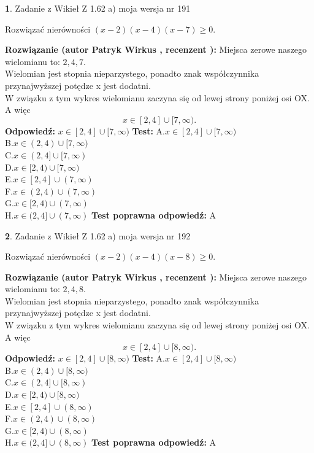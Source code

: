 \documentclass[12pt, a4paper]{article}
\theoremstyle{definition} %
\newtheorem{zad}{}
\newcommand{\zadStart}[1]{\begin{zad}#1\newline}
\newcommand{\zadStop}{\end{zad}}
\newcommand{\rozwStart}[2]{\noindent \textbf{Rozwiązanie (autor #1 , recenzent #2): }\newline}
\newcommand{\rozwStop}{\newline}
\newcommand{\odpStart}{\noindent \textbf{Odpowiedź:}\newline}
\newcommand{\odpStop}{\newline}
\newcommand{\testStart}{\noindent \textbf{Test:}\newline}
\newcommand{\testStop}{\newline}
\newcommand{\kluczStart}{\noindent \textbf{Test poprawna odpowiedź:}\newline}
\newcommand{\kluczStop}{\newline}
\begin{document}
\zadStart{Zadanie z Wikieł Z 1.62 a) moja wersja nr 191}

Rozwiązać nierówności $(x-2)(x-4)(x-7)\ge0$.
\zadStop
\rozwStart{Patryk Wirkus}{}
Miejsca zerowe naszego wielomianu to: $2, 4, 7$.\\
Wielomian jest stopnia nieparzystego, ponadto znak współczynnika przy\linebreak najwyższej potędze x jest dodatni.\\ W związku z tym wykres wielomianu zaczyna się od lewej strony poniżej osi OX. A więc $$x \in [2,4] \cup [7,\infty).$$
\rozwStop
\odpStart
$x \in [2,4] \cup [7,\infty)$
\odpStop
\testStart
A.$x \in [2,4] \cup [7,\infty)$\\
B.$x \in (2,4) \cup [7,\infty)$\\
C.$x \in (2,4] \cup [7,\infty)$\\
D.$x \in [2,4) \cup [7,\infty)$\\
E.$x \in [2,4] \cup (7,\infty)$\\
F.$x \in (2,4) \cup (7,\infty)$\\
G.$x \in [2,4) \cup (7,\infty)$\\
H.$x \in (2,4] \cup (7,\infty)$
\testStop
\kluczStart
A
\kluczStop



\zadStart{Zadanie z Wikieł Z 1.62 a) moja wersja nr 192}

Rozwiązać nierówności $(x-2)(x-4)(x-8)\ge0$.
\zadStop
\rozwStart{Patryk Wirkus}{}
Miejsca zerowe naszego wielomianu to: $2, 4, 8$.\\
Wielomian jest stopnia nieparzystego, ponadto znak współczynnika przy\linebreak najwyższej potędze x jest dodatni.\\ W związku z tym wykres wielomianu zaczyna się od lewej strony poniżej osi OX. A więc $$x \in [2,4] \cup [8,\infty).$$
\rozwStop
\odpStart
$x \in [2,4] \cup [8,\infty)$
\odpStop
\testStart
A.$x \in [2,4] \cup [8,\infty)$\\
B.$x \in (2,4) \cup [8,\infty)$\\
C.$x \in (2,4] \cup [8,\infty)$\\
D.$x \in [2,4) \cup [8,\infty)$\\
E.$x \in [2,4] \cup (8,\infty)$\\
F.$x \in (2,4) \cup (8,\infty)$\\
G.$x \in [2,4) \cup (8,\infty)$\\
H.$x \in (2,4] \cup (8,\infty)$
\testStop
\kluczStart
A
\kluczStop
\end{document}
